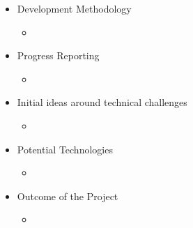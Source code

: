\begin{itemize}
	\item Development Methodology
	\begin{itemize}
		\item[] 
	\end{itemize}
	
	\item Progress Reporting
	\begin{itemize}
		\item[] 
	\end{itemize}
	
	\item Initial ideas around technical challenges
	\begin{itemize}
		\item[] 
	\end{itemize}
	
	\item Potential Technologies
	\begin{itemize}
		\item[] 
	\end{itemize}
	
	\item Outcome of the Project
	\begin{itemize}
		\item[] 
	\end{itemize}
	
\end{itemize}